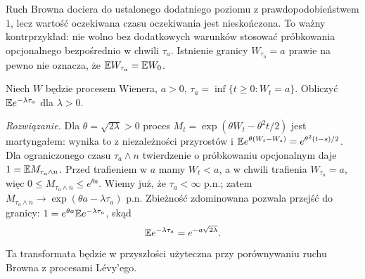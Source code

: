 \begin{uwaga}
Ruch Browna dociera do ustalonego dodatniego poziomu
z prawdopodobieństwem $1$, lecz wartość oczekiwana
czasu oczekiwania jest nieskończona.
To ważny kontrprzykład: nie wolno bez dodatkowych
warunków stosować próbkowania opcjonalnego bezpośrednio
w chwili $\tau_a$. Istnienie granicy $W_{\tau_a}=a$
prawie na pewno nie oznacza, że
$\mathbb{E} W_{\tau_a}=\mathbb{E} W_0$.
\end{uwaga}

\begin{zadanie}
Niech $W$ będzie procesem Wienera, $a>0$,
$\tau_a=\inf\{t\ge0:W_t=a\}$.
Obliczyć $\mathbb{E} e^{-\lambda\tau_a}$ dla $\lambda>0$.

\emph{Rozwiązanie.} Dla $\theta=\sqrt{2\lambda}>0$
proces $M_t=\exp(\theta W_t-\theta^2t/2)$
jest martyngałem: wynika to z niezależności przyrostów i
$\mathbb{E} e^{\theta(W_t-W_s)}=e^{\theta^2(t-s)/2}$.
Dla ograniczonego czasu $\tau_a\wedge n$ twierdzenie o
próbkowaniu opcjonalnym daje
$1=\mathbb{E} M_{\tau_a\wedge n}$.
Przed trafieniem w $a$ mamy $W_t<a$, a w chwili
trafienia $W_{\tau_a}=a$, więc
$0\le M_{\tau_a\wedge n}\le e^{\theta a}$.
Wiemy już, że $\tau_a<\infty$ p.n.; zatem
$M_{\tau_a\wedge n}\to\exp(\theta a-\lambda\tau_a)$
p.n. Zbieżność zdominowana pozwala przejść do granicy:
$1=e^{\theta a}\mathbb{E} e^{-\lambda\tau_a}$, skąd
\[
\mathbb{E} e^{-\lambda\tau_a}=e^{-a\sqrt{2\lambda}}.
\]
Ta transformata będzie w przyszłości użyteczna przy
porównywaniu ruchu Browna z procesami Lévy'ego.
\end{zadanie}


